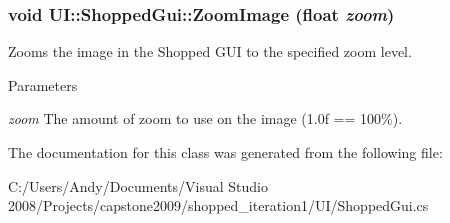 \hypertarget{class_u_i_1_1_shopped_gui_ad0f2c5e2eb63419a49622ab3faa2d347}{
\subsubsection[{ZoomImage}]{\setlength{\rightskip}{0pt plus 5cm}void UI::ShoppedGui::ZoomImage (float {\em zoom})}}
\label{class_u_i_1_1_shopped_gui_ad0f2c5e2eb63419a49622ab3faa2d347}
Zooms the image in the Shopped GUI to the specified zoom level. 
\begin{DoxyParams}{Parameters}
\item[{\em zoom}]The amount of zoom to use on the image (1.0f == 100\%). \end{DoxyParams}


The documentation for this class was generated from the following file:\begin{DoxyCompactItemize}
\item 
C:/Users/Andy/Documents/Visual Studio 2008/Projects/capstone2009/shopped\_\-iteration1/UI/ShoppedGui.cs\end{DoxyCompactItemize}
